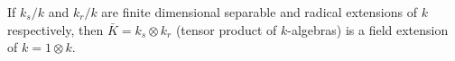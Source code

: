 If $k_s/k$ and $k_r/k$ are finite dimensional separable and radical extensions of $k$ respectively, then $\bar{K} = k_s \otimes k_r$ (tensor product of $k$-algebras) is a field extension of $k = 1 \otimes k$.
